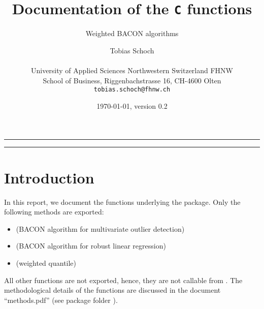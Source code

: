 \documentclass[a4paper,oneside,10pt,DIV=12]{scrartcl}
\begin{document}
\title{\Large Documentation of the \texttt{C} functions}
\subtitle{Weighted BACON algorithms}

\author{{\normalsize Tobias Schoch} \\
\begin{minipage}[t][][t]{\textwidth}
	\begin{center}
	\small{University of Applied Sciences Northwestern Switzerland FHNW} \\
	\small{School of Business, Riggenbachstrasse 16, CH-4600 Olten} \\
	\small{\texttt{tobias.schoch{@}fhnw.ch}}
	\end{center}
\end{minipage}}

\date{{\small \today, version 0.2}}
\maketitle


\vspace{1em}
\hrule
\vspace{-0.5em}
\setcounter{tocdepth}{1}
\tableofcontents
\vspace{0.5em}
\hrule
\vspace{1em}


\section{Introduction}
In this report, we document the  functions underlying the 
 package. Only the following methods are exported:
\begin{itemize}
	\item {} (BACON algorithm for multivariate
		outlier detection)
	\item {} (BACON algorithm for robust
		linear regression)
	\item {} (weighted quantile)
\end{itemize}

\noindent All other functions are not exported, hence, they are not callable
from . The methodological details of the functions are discussed in the
document ``methods.pdf'' (see package folder ).
\end{document}
